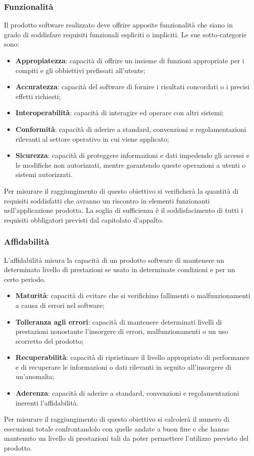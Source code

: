 \subsubsection{Funzionalità}
Il prodotto software realizzato deve offrire apposite funzionalità
che siano in grado di soddisfare requisiti funzionali espliciti o impliciti. Le sue sotto-categorie sono:
\begin{itemize}
	\item \textbf{Appropiatezza}: capacità di offrire un insieme di funzioni appropriate per i compiti e gli obbiettivi prefissati all'utente;
	\item \textbf{Accuratezza}: capacità del software di fornire i risultati concordati o i precisi effetti richiesti;
	\item \textbf{Interoperabilità}: capacità di interagire ed operare con altri sistemi;
	\item \textbf{Conformità}: capacità di aderire a standard, convenzioni e regolamentazioni rilevanti al settore operativo in cui viene applicato;
    \item \textbf{Sicurezza}: capacità di proteggere informazioni e dati impedendo gli accessi e le modifiche non autorizzati, mentre garantendo queste operazioni a utenti o sistemi autorizzati.
\end{itemize}
Per misurare il raggiungimento di questo obiettivo si verificherà
la quantità di requisiti soddisfatti che avranno un riscontro in elementi funzionanti nell'applicazione prodotta. La soglia di sufficienza è il soddisfacimento di tutti i requisiti obbligatori previsti dal capitolato d'appalto.
\subsubsection{Affidabilità}
L'affidabilità misura la capacità di un prodotto software di mantenere un determinato livello di prestazioni se usato in determinate condizioni e per un certo periodo.
\begin{itemize}
	\item \textbf{Maturità}: capacità di evitare che si verifichino fallimenti o  malfunzionamenti a causa di errori nel software;
	\item \textbf{Tolleranza agli errori}: capacità di mantenere determinati livelli di prestazioni nonostante l'insorgere di errori, malfunzionamenti o un uso scorretto del prodotto;
	\item \textbf{Recuperabilità}: capacità di ripristinare il livello appropriato di performance e di recuperare le informazioni o dati rilevanti in seguito all'insorgere di un'anomalia;
	\item \textbf{Aderenza}: capacità di aderire a standard, convenzioni e regolamentazioni inerenti l'affidabilità.
\end{itemize}
Per misurare il raggiungimento di questo obiettivo si calcolerà il numero di esecuzioni totale  confrontandolo con quelle andate a buon fine e che hanno mantenuto un livello di prestazioni tali da poter permettere l'utilizzo previsto del prodotto.
